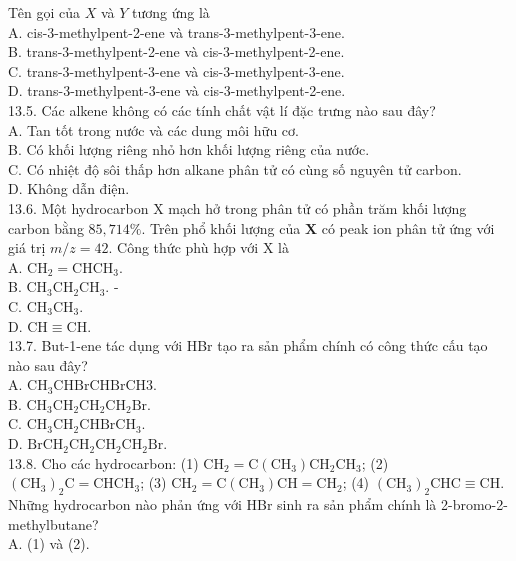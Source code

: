 \documentclass[10pt]{article}
\begin{document}
Tên gọi của $X$ và $Y$ tương ứng là\\
A. cis-3-methylpent-2-ene và trans-3-methylpent-3-ene.\\
B. trans-3-methylpent-2-ene và cis-3-methylpent-2-ene.\\
C. trans-3-methylpent-3-ene và cis-3-methylpent-3-ene.\\
D. trans-3-methylpent-3-ene và cis-3-methylpent-2-ene.\\
13.5. Các alkene không có các tính chất vật lí đặc trưng nào sau đây?\\
A. Tan tốt trong nước và các dung môi hữu cơ.\\
B. Có khối lượng riêng nhỏ hơn khối lượng riêng của nước.\\
C. Có nhiệt độ sôi thấp hơn alkane phân tử có cùng số nguyên tử carbon.\\
D. Không dẫn điện.\\
13.6. Một hydrocarbon X mạch hở trong phân tử có phần trăm khối lượng carbon bằng $85,714 \%$. Trên phổ khối lượng của $\mathbf{X}$ có peak ion phân tử ứng với giá trị $m / z=42$. Công thức phù hợp với X là\\
A. $\mathrm{CH}_{2}=\mathrm{CHCH}_{3}$.\\
B. $\mathrm{CH}_{3} \mathrm{CH}_{2} \mathrm{CH}_{3}$. -\\
C. $\mathrm{CH}_{3} \mathrm{CH}_{3}$.\\
D. $\mathrm{CH} \equiv \mathrm{CH}$.\\
13.7. But-1-ene tác dụng với HBr tạo ra sản phẩm chính có công thức cấu tạo nào sau đây?\\
A. $\mathrm{CH}_{3} \mathrm{CHBrCHBrCH} 3$.\\
B. $\mathrm{CH}_{3} \mathrm{CH}_{2} \mathrm{CH}_{2} \mathrm{CH}_{2} \mathrm{Br}$.\\
C. $\mathrm{CH}_{3} \mathrm{CH}_{2} \mathrm{CHBrCH}_{3}$.\\
D. $\mathrm{BrCH}_{2} \mathrm{CH}_{2} \mathrm{CH}_{2} \mathrm{CH}_{2} \mathrm{Br}$.\\
13.8. Cho các hydrocarbon: (1) $\mathrm{CH}_{2}=\mathrm{C}\left(\mathrm{CH}_{3}\right) \mathrm{CH}_{2} \mathrm{CH}_{3}$; (2) $\left(\mathrm{CH}_{3}\right)_{2} \mathrm{C}=\mathrm{CHCH}_{3}$; (3) $\mathrm{CH}_{2}=\mathrm{C}\left(\mathrm{CH}_{3}\right) \mathrm{CH}=\mathrm{CH}_{2}$; (4) $\left(\mathrm{CH}_{3}\right)_{2} \mathrm{CHC} \equiv \mathrm{CH}$. Những hydrocarbon nào phản ứng với HBr sinh ra sản phẩm chính là 2-bromo-2-methylbutane?\\
A. (1) và (2).\\
\end{document}
